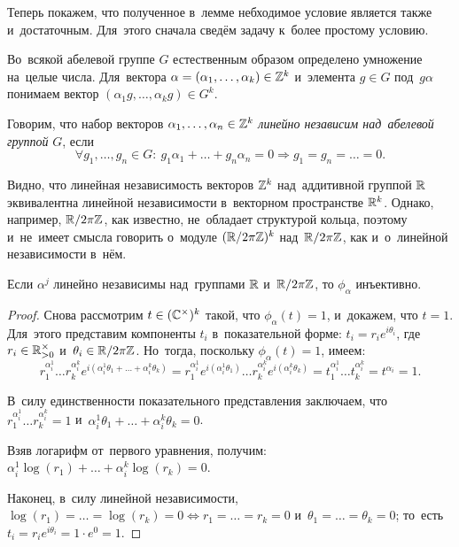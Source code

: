 \documentclass{article}
\begin{document}
Теперь покажем, что полученное в~лемме небходимое условие является также и~достаточным.
Для~этого сначала сведём задачу к~более простому условию.

Во~всякой абелевой группе $G$ естественным образом определено умножение на~целые числа.
Для~вектора $\alpha = (\alpha_1, \ldots, \alpha_k) \in \mathbb{Z}^k$ и~элемента $g \in G$
под~$g \alpha$ понимаем вектор $(\alpha_1 g, \ldots, \alpha_k g) \in G^k$.

Говорим, что набор векторов $\alpha_1, \ldots, \alpha_n \in \mathbb{Z}^k$ \textit{линейно независим над~абелевой группой} $G$, если
$$
    \forall g_1, \ldots, g_n \in G{:}\ g_1 \alpha_1 + \ldots + g_n \alpha_n = 0 \Rightarrow g_1 = g_n = \ldots = 0.
$$

Видно, что линейная независимость векторов $\mathbb{Z}^k$ над~аддитивной группой $\mathbb{R}$ эквивалентна линейной независимости
в~векторном пространстве $\mathbb{R}^k$. Однако, например, $\mathbb{R} / 2 \pi \mathbb{Z}$, как известно, не~обладает структурой кольца,
поэтому и~не~имеет смысла говорить о~модуле $(\mathbb{R} / 2 \pi \mathbb{Z})^k$ над~$\mathbb{R} / 2 \pi \mathbb{Z}$, как и~о~линейной независимости
в~нём.

\begin{lemma*}
    Если $\alpha^j$ линейно независимы над~группами $\mathbb{R}$ и~$\mathbb{R} / 2 \pi \mathbb{Z}$, то $\phi_\alpha$ инъективно.
\end{lemma*}

\begin{proof}
    Снова рассмотрим $t \in (\mathbb{C}^\times)^k$ такой, что $\phi_\alpha(t) = 1$, и~докажем, что $t = 1$.
    Для~этого представим компоненты $t_i$ в~показательной форме: $t_i = r_i e^{i {\theta_i}}$, где $r_i \in \mathbb{R}_{>0}^\times$ и~$\theta_i \in \mathbb{R} / 2 \pi \mathbb{Z}$.
    Но~тогда, поскольку $\phi_\alpha(t) = 1$, имеем:
    $$
        r_1^{\alpha_i^1} \ldots r_k^{\alpha_i^k} e^{i(\alpha_i^1 \theta_1 + \ldots + \alpha_i^k \theta_k)} =
        r_1^{\alpha_i^1} e^{i(\alpha_i^1 \theta_1)} \ldots r_k^{\alpha_i^k} e^{i(\alpha_i^k \theta_k)} =
        t_1^{\alpha_i^1} \ldots t_k^{\alpha_i^k} =
        t^{\alpha_i} = 1.
    $$

    В~силу единственности показательного представления заключаем, что
    $r_1^{\alpha_i^1} \ldots r_k^{\alpha_i^k} = 1$ и~$\alpha_i^1 \theta_1 + \ldots + \alpha_i^k \theta_k = 0$.

    Взяв логарифм от~первого уравнения, получим:
    $ \alpha_i^1 \log(r_1) + \ldots + \alpha_i^k \log(r_k) = 0$.

    Наконец, в~силу линейной независимости, $\log(r_1) = \ldots = \log(r_k) = 0 \Leftrightarrow r_1 = \ldots = r_k = 0$
    и~$\theta_1 = \ldots = \theta_k = 0$; то~есть $t_i = r_i e^{i \theta_i} = 1 \cdot e^0 = 1$.
\end{proof}
\end{document}
